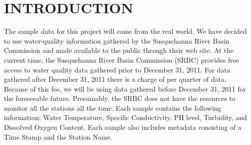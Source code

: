 \documentclass[a4paper]{article}
\begin{document}
\begin{minipage}[t]{0.45\textwidth}
\section*{INTRODUCTION}{\normalsize 
The sample data for this project will come from the real world. 
We have decided to use water-quality information gathered by the Susquehanna River Basin Commission and made available to the public through their web site. 
At the current time, the Susquehanna River Basin Commission (SRBC) provides free access to water quality data gathered prior to December 31, 2011. 
For data gathered after December 31, 2011 there is a charge of  per quarter of data. Because of this fee, we will be using data gathered before December 31, 2011 for the foreseeable future.
Presumably, the SRBC does not have the resources to monitor all the stations all the time. 
Each sample contains the following information: Water Temperature, Specific Conductivity, PH level, Turbidity, and Dissolved Oxygen Content. 
Each sample also includes metadata consisting of a Time Stamp and the Station Name. }
\renewcommand\footnoterule{\rule{\linewidth}{0.5pt}}
\end{minipage}  
\hspace{.5cm}
\end{document}
